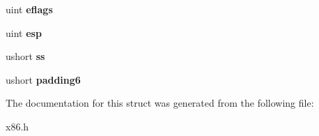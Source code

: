 \begin{DoxyCompactItemize}
\item 
uint {\bfseries eflags}\hypertarget{structtrapframe_ae6b3005ad34416546603ab18dbb4a644}{}\label{structtrapframe_ae6b3005ad34416546603ab18dbb4a644}

\item 
uint {\bfseries esp}\hypertarget{structtrapframe_acd319e2dbd720d217c10f8fb620d73e2}{}\label{structtrapframe_acd319e2dbd720d217c10f8fb620d73e2}

\item 
ushort {\bfseries ss}\hypertarget{structtrapframe_aa9c9b52b242d4f42fe4252e26b655bf6}{}\label{structtrapframe_aa9c9b52b242d4f42fe4252e26b655bf6}

\item 
ushort {\bfseries padding6}\hypertarget{structtrapframe_a1c079b271df9fdd3502bfe9e00888dfa}{}\label{structtrapframe_a1c079b271df9fdd3502bfe9e00888dfa}

\end{DoxyCompactItemize}


The documentation for this struct was generated from the following file\+:\begin{DoxyCompactItemize}
\item 
x86.\+h\end{DoxyCompactItemize}
